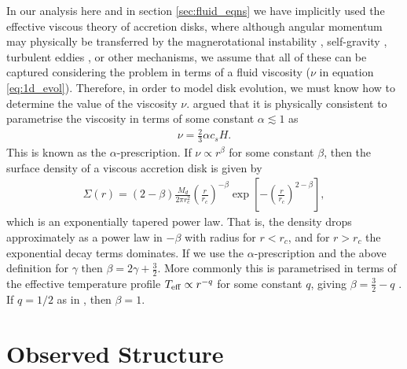 In our analysis here and in section \ref{sec:fluid_eqns} we have implicitly used the effective viscous theory of accretion disks, where although angular momentum may physically be transferred by the magnerotational instability \citep{sano2000}, self-gravity \citep{kratter2016}, turbulent eddies \citep{klahr2003}, or other mechanisms, we assume that all of these can be captured considering the problem in terms of a fluid viscosity ($\nu$ in equation \ref{eq:1d_evol}).
Therefore, in order to model disk evolution, we must know how to determine the value of the viscosity $\nu$.
\citet{shakura1973} argued that it is physically consistent to parametrise the viscosity in terms of some constant $\alpha \lesssim 1$ as
\begin{align}
    \nu = \frac{2}{3} \alpha c_s H.
\end{align}
This is known as the $\alpha$-prescription. If $\nu \propto r^\beta$ for some constant $\beta$, then the surface density of a viscous accretion disk is given by \citep{lynden-bell1974}
\begin{align}
    \Sigma(r) = (2 - \beta) \frac{M_d}{2 \pi r_c^2} \left( \frac{r}{r_c} \right)^{-\beta} \exp{\left[ - \left(\frac{r}{r_c}\right)^{2-\beta} \right]},
\end{align}
which is an exponentially tapered power law. That is, the density drops approximately as a power law in $-\beta$ with radius for $r < r_c$, and for $r > r_c$ the exponential decay terms dominates. If we use the $\alpha$-prescription and the above definition for $\gamma$ then $\beta=2\gamma+\frac{3}{2}$. 
More commonly this is parametrised in terms of the effective temperature profile $T_{\rm eff} \propto r^{-q}$ for some constant $q$, giving $\beta = \frac{3}{2} - q$ \citep{hartmann1998}. 
If $q=1/2$ as in \citet{chiang1997}, then $\beta=1$.

\section{Observed Structure}

